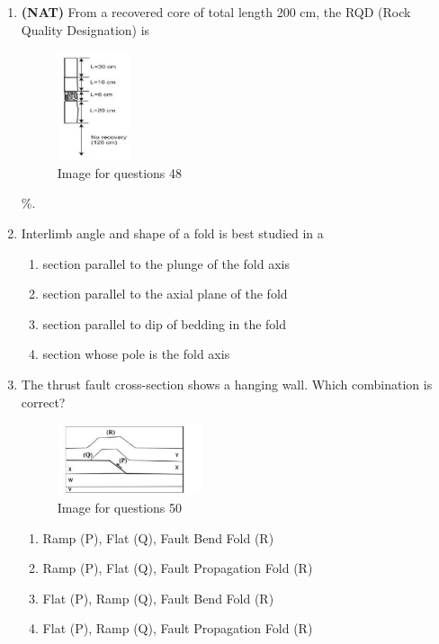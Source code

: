 \documentclass[journal,12pt,onecolumn]{IEEEtran}
\theoremstyle{remark}
\begin{document}
\begin{enumerate}
\item \textbf{(NAT)} From a recovered core of total length 200 cm, the RQD (Rock Quality Designation) is 

\begin{figure}[H]
    \centering
    \includegraphics[width=0.2\textwidth]{figs/fig11.png}
    \caption{Image for questions 48}
    \label{fig:question48}
\end{figure}



\underline{\hspace{3cm}}\%.  
\vspace{0.3cm}

\item Interlimb angle and shape of a fold is best studied in a  
\begin{enumerate}
\item section parallel to the plunge of the fold axis  
\item section parallel to the axial plane of the fold  
\item section parallel to dip of bedding in the fold  
\item section whose pole is the fold axis  
\end{enumerate}

\item The thrust fault cross-section shows a hanging wall. Which combination is correct?  
\begin{figure}[H]
    \centering
    \includegraphics[width=0.4\textwidth]{figs/fig12.png}
    \caption{Image for questions 50}
    \label{fig:question28}
\end{figure}





\begin{enumerate}
\item Ramp (P), Flat (Q), Fault Bend Fold (R)  
\item Ramp (P), Flat (Q), Fault Propagation Fold (R)  
\item Flat (P), Ramp (Q), Fault Bend Fold (R)  
\item Flat (P), Ramp (Q), Fault Propagation Fold (R)  
\end{enumerate}


\end{enumerate}
\end{document}
